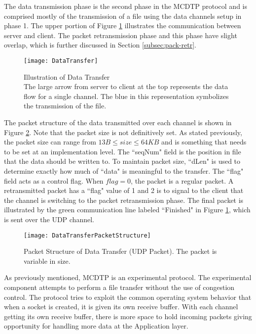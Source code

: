 The data transmission phase is the second phase in the MCDTP protocol and is comprised mostly of the transmission of a file using the data channels setup in phase 1. The upper portion of Figure \ref{fig:data-tr} illustrates the communication between server and client. The packet retransmission phase and this phase have slight overlap, which is further discussed in Section \ref{subsec:pack-retr}.

\begin{figure}[ht]
\centering
\texttt{[image: DataTransfer]}
\caption{Illustration of Data Transfer\\
The large arrow from server to client at the top represents the data flow for a single channel. The blue in this representation symbolizes the transmission of the file.}
\label{fig:data-tr}
\end{figure}

The packet structure of the data transmitted over each channel is shown in Figure \ref{fig:data-tr-struct}. Note that the packet size is not definitively set. As stated previously, the packet size can range from $13B \leq size \leq 64KB$ and is something that needs to be set at an implementation level. The ``seqNum" field is the position in file that the data should be written to. To maintain packet size, ``dLen" is used to determine exactly how much of ``data" is meaningful to the transfer. The ``flag" field acts as a control flag. When $flag=0$, the packet is a regular packet. A retransmitted packet has a ``flag" value of 1 and 2 is to signal to the client that the channel is switching to the packet retransmission phase. The final packet is illustrated by the green communication line labeled ``Finished" in Figure \ref{fig:data-tr}, which is sent over the UDP channel.

\begin{figure}[ht]
\centering
\texttt{[image: DataTransferPacketStructure]}
\caption{Packet Structure of Data Transfer (UDP Packet). The packet is variable in size.}
\label{fig:data-tr-struct}
\end{figure}

As previously mentioned, MCDTP is an experimental protocol. The experimental component attempts to perform a file transfer without the use of congestion control. The protocol tries to exploit the common operating system behavior that when a socket is created, it is given its own receive buffer. With each channel getting its own receive buffer, there is more space to hold incoming packets giving opportunity for handling more data at the Application layer.


